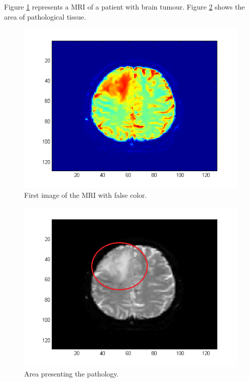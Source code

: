 Figure \ref{fig:Clean} represents a MRI of a patient with brain tumour. Figure \ref{fig:CleanGray} shows the area of pathological tissue.

\begin{figure}
\centering
    \includegraphics[scale=0.5,angle=0]{Imageclean.png}
    \caption{First image of the MRI with false color.}
    \label{fig:Clean}
\end{figure}

\begin{figure}
\centering
    \includegraphics[scale=0.5,angle=0]{ImageGray.png}
    \caption{Area presenting the pathology.}
    \label{fig:CleanGray}
\end{figure}

